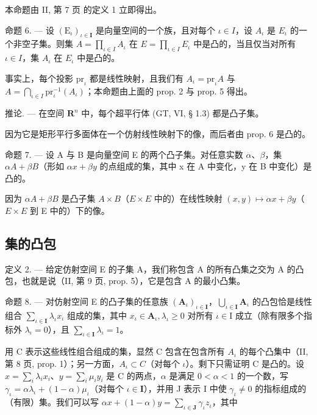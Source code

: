 本命题由 II, 第 7 页 的定义 1 立即得出。

命题 6. --- 设 \((\mathrm{E}_{\iota})_{\iota\in\mathbf{I}}\) 是向量空间的一个族，且对每个 \(\iota\in I\)，设 \(A_{\iota}\) 是 \(E_{\iota}\) 的一个非空子集。则集 \(A=\prod_{\iota\in I}A_{\iota}\) 在 \(E=\prod_{\iota\in I}E_{\iota}\) 中是凸的，当且仅当对所有 \(\iota\in I\)，集 \(A_{\iota}\) 在 \(E_{\iota}\) 中是凸的。

事实上，每个投影 \(\mathrm{pr}_{\iota}\) 都是线性映射，且我们有 \(A_{\iota} = \mathrm{pr}_{\iota}A\) 与 \(A = \bigcap_{\iota \in I} \mathrm{pr}_{\iota}^{-1}(A_{\iota})\)；本命题由上面的 prop. 2 与 prop. 5 得出。

推论. --- 在空间 \(\mathbf{R}^n\) 中，每个超平行体 (GT, VI, § 1.3) 都是凸子集。

因为它是矩形平行多面体在一个仿射线性映射下的像，而后者由 prop. 6 是凸的。

命题 7. --- 设 A 与 B 是向量空间 E 的两个凸子集。对任意实数 \(\alpha\)、\(\beta\)，集 \(\alpha A + \beta B\)（形如 \(\alpha x + \beta y\) 的点组成的集，其中 x 在 A 中变化，y 在 B 中变化）是凸的。

因为 \(\alpha A + \beta B\) 是凸子集 \(A \times B\)（\(E \times E\) 中的）在线性映射 \((x, y) \mapsto \alpha x + \beta y\)（\(E \times E\) 到 E 中的）下的像。

\subsection{集的凸包}

定义 2. --- 给定仿射空间 E 的子集 A，我们称包含 A 的所有凸集之交为 A 的凸包，也就是说（II, 第 9 页, prop. 5），它是包含 A 的最小凸集。

命题 8. --- 对仿射空间 E 的凸子集的任意族 \((\mathbf{A}_{\iota})_{\iota \in \mathbf{I}}\)，\(\bigcup_{\iota \in \mathbf{I}}\mathbf{A}_{\iota}\) 的凸包恰是线性组合 \(\sum_{\iota \in \mathbf{I}}\lambda_{\iota}x_{\iota}\) 组成的集，其中 \(x_{\iota}\in \mathbf{A}_{\iota},\lambda_{\iota}\geqslant 0\) 对所有 \(\iota \in \mathrm{I}\) 成立（除有限多个指标外 \(\lambda_{\iota} = 0\)），且 \(\sum_{\iota \in \mathbf{I}}\lambda_{\iota} = 1\)。

用 C 表示这些线性组合组成的集，显然 C 包含在包含所有 \(A_{\iota}\) 的每个凸集中（II, 第 8 页, prop. 1）；另一方面，\(A_{\iota} \subset C\)（对每个 \(\iota\)）。剩下只需证明 C 是凸的。设 \(x = \sum_{i} \lambda_{i} x_{i}\)、\(y = \sum_{i} \mu_{i} y_{i}\) 是 C 的两点，\(\alpha\) 是满足 \(0 < \alpha < 1\) 的一个数，写 \(\gamma_{\iota} = \alpha \lambda_{\iota} + (1 - \alpha)\mu_{\iota}\)（对每个 \(\iota \in \mathbf{I}\)），并用 J 表示 I 中使 \(\gamma_{\iota} \neq 0\) 的指标组成的（有限）集。我们可以写 \(\alpha x + (1 - \alpha)y = \sum_{\iota \in \mathbf{J}}\gamma_{\iota}z_{\iota}\)，其中


